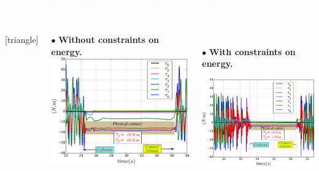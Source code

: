 \begin{frame}
\frametitle{{\textcolor{white}{\hspace{0.2cm}Interaction torques during physical-contact}}}
\begin{columns}
\column{\dimexpr\paperwidth-4pt}
[triangle] 
\begin{columns}
\column{.5\paperwidth}
\begin{center}
\vspace{-2.5mm}
\hspace{2mm} $\bullet$ \textbf{Without constraints on energy.}
\hspace{11mm}
\vspace{-3.5mm}
\includegraphics[width=0.95\columnwidth]{figures/torques_without_contstr.pdf}
\end{center}

\vspace{-6mm}
\begin{center} \\


\hspace{-16mm} $\bullet$ \textbf{With constraints on energy.}

\hspace{-10mm}
\vspace{-6.5mm}
\includegraphics[width=0.95\columnwidth]{figures/torques_with_contstr.pdf}


\end{center}
\end{columns}
\end{columns}
\end{frame}
